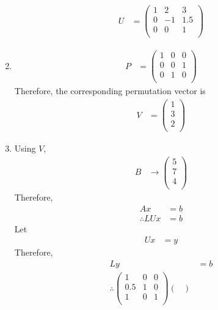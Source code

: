 \documentclass[fleqn, a4paper, 12pt, twoside]{article}
\theoremstyle{definition}
\theoremstyle{theorem}
\begin{document}
\begin{solution}
\begin{enumerate}[leftmargin=*]
\begin{align*}
				U &=
					\begin{pmatrix}
						1 & 2  & 3   \\
						0 & -1 & 1.5 \\
						0 & 0  & 1   \\
					\end{pmatrix}
			\end{align*}
		\item
			\begin{align*}
				P &=
					\begin{pmatrix}
						1 & 0 & 0 \\
						0 & 0 & 1 \\
						0 & 1 & 0 \\
					\end{pmatrix}
			\end{align*}
			Therefore, the corresponding permutation vector is
			\begin{align*}
				V &=
					\begin{pmatrix}
						1 \\
						3 \\
						2 \\
					\end{pmatrix}
			\end{align*}
		\item
			Using $V$,
			\begin{align*}
				B &\to
					\begin{pmatrix}
						5 \\
						7 \\
						4 \\
					\end{pmatrix}
			\end{align*}
			Therefore,
			\begin{align*}
				A x              & = b \\
				\therefore L U x & = b
			\end{align*}
			Let
			\begin{align*}
				U x & = y
			\end{align*}
			Therefore,
			\begin{align*}
				L y &= b\\
				\therefore 
					\begin{pmatrix}
						1   & 0 & 0 \\
						0.5 & 1 & 0 \\
						1   & 0 & 1 \\
					\end{pmatrix}
					\begin{pmatrix}

\end{pmatrix}
\end{align*}
\end{enumerate}
\end{solution}
\end{document}

